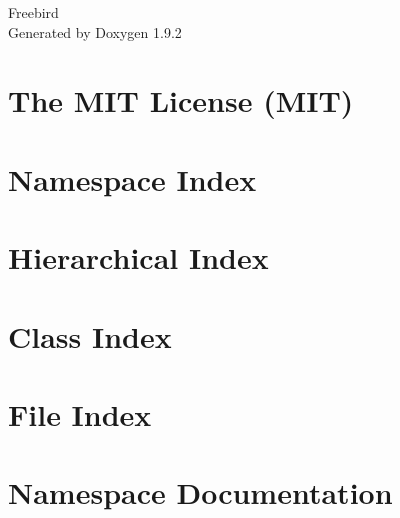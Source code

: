 \documentclass[twoside]{book}
\newcommand{\+}{\discretionary{\mbox{\scriptsize$\hookleftarrow$}}{}{}}
\newcommand{\clearemptydoublepage}{%
    \newpage{\pagestyle{empty}\cleardoublepage}%
  }
\begin{document}
  \raggedbottom
    \hypersetup{pageanchor=false,
                bookmarksnumbered=true,
                pdfencoding=unicode
               }
  \begin{titlepage}
  \vspace*{7cm}
  \begin{center}%
  {\Large Freebird}\\
  \vspace*{1cm}
  {\large Generated by Doxygen 1.9.2}\\
  \end{center}
  \end{titlepage}
  \clearemptydoublepage
  \tableofcontents
  \clearemptydoublepage
  \hypersetup{pageanchor=true}
\chapter{The MIT License (MIT)}
\label{md__c___users__danilo_source_repos__freebird_tech_wwwroot_lib_jquery_validation__l_i_c_e_n_s_e}

\chapter{Namespace Index}

\chapter{Hierarchical Index}

\chapter{Class Index}

\chapter{File Index}

\chapter{Namespace Documentation}

















\end{document}

